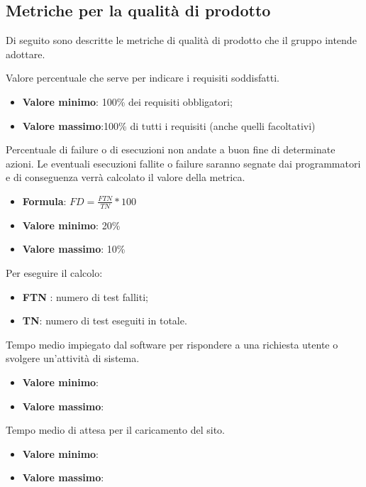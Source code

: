\pagebreak
\setcounter{M}{0}
\subsection{Metriche per la qualità di prodotto}
Di seguito sono descritte le metriche di qualità di prodotto che il gruppo intende adottare.

Valore percentuale che serve per indicare i requisiti soddisfatti.
\begin{itemize}
    \item \textbf{Valore minimo}: 100\% dei requisiti obbligatori;
    \item \textbf{Valore massimo}:100\% di tutti i requisiti (anche quelli facoltativi)
\end{itemize}  

Percentuale di failure o di esecuzioni non andate a buon fine di determinate azioni. Le
eventuali esecuzioni fallite o failure saranno segnate dai programmatori e di conseguenza verrà calcolato
il valore della metrica.
\begin{itemize}
    \item \textbf{Formula}: $FD=\frac{FTN}{TN}*100$
    \item \textbf{Valore minimo}: 20\%
    \item \textbf{Valore massimo}: 10\%
\end{itemize}  
Per eseguire il calcolo:
\begin{itemize}
    \item \textbf{FTN} : numero di test falliti;
    \item \textbf{TN}: numero di test eseguiti in totale.
\end{itemize}


Tempo medio impiegato dal software per rispondere a una richiesta utente o svolgere un’attività di sistema. 
\begin{itemize}
    \item \textbf{Valore minimo}:
    \item \textbf{Valore massimo}:
\end{itemize}  


Tempo medio di attesa per il caricamento del sito.
\begin{itemize}
    \item \textbf{Valore minimo}:
    \item \textbf{Valore massimo}:
\end{itemize}  


